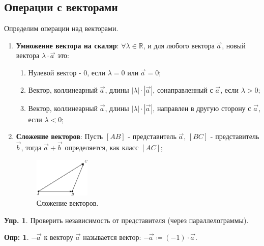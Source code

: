 \documentclass[12pt]{article}
\newcommand{\MR}{\mathbb{R}}
\theoremstyle{definition}
\newtheorem{defn}{Опр:}
\newtheorem{exrc}{Упр.}
\newcommand{\vecm}[1]{\overrightarrow{#1\,}}
\begin{document}
\subsection*{Операции с векторами}
Определим операции над векторами.
\begin{enumerate}[label=\arabic*)]
	\item \textbf{Умножение вектора на скаляр}: $\forall \lambda \in \MR$, и для любого вектора $\vecm{a}$, новый вектора $\lambda{\cdot}\vecm{a}$ это:
	\begin{enumerate}[label=(\arabic*)]
		\item Нулевой вектор - $0$, если $\lambda = 0$ или $\vecm{a} = 0$;
		\item Вектор, коллинеарный $\vecm{a}$, длины $|\lambda|{\cdot}|\vecm{a}|$, сонаправленный с $\vecm{a}$, если $\lambda > 0$;
		\item Вектор, коллинеарный $\vecm{a}$, длины $|\lambda|{\cdot}|\vecm{a}|$, направлен в другую сторону с $\vecm{a}$, если $\lambda < 0$;
	\end{enumerate}
	\item \textbf{Сложение векторов}: Пусть $[AB]$ - представитель $\vecm{a}$, $[BC]$ - представитель $\vecm{b}$, тогда $\vecm{a} + \vecm{b}$ определяется, как класс $[AC]$;
	\begin{figure}[H]
		\centering
		\includegraphics[width=0.25\textwidth]{ANGL4_4.eps}
		\caption{Сложение векторов.}
		\label{4_4}
	\end{figure}
\end{enumerate}
\begin{exrc}
	Проверить независимость от представителя (через параллелограммы).
\end{exrc}
\begin{defn}
	 $-\vecm{a}$ к вектору $\vecm{a}$ называется вектор: $-\vecm{a} \coloneqq (-1){\cdot}\vecm{a}$.
\end{defn}
\end{document}
